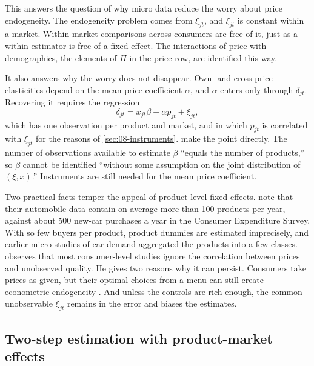 This answers the question of why micro data reduce the worry about price endogeneity. The endogeneity problem comes
from $\xi_{jt}$, and $\xi_{jt}$ is constant within a market. Within-market comparisons across consumers are free of it,
just as a within estimator is free of a fixed effect. The interactions of price with demographics, the elements of
$\Pi$ in the price row, are identified this way.

It also answers why the worry does not disappear. Own- and cross-price elasticities depend on the mean price
coefficient $\alpha$, and $\alpha$ enters only through $\delta_{jt}$. Recovering it requires the regression
\begin{equation}\label{eq:08-micro-second}
  \delta_{jt} = x_{jt}\beta - \alpha p_{jt} + \xi_{jt},
\end{equation}
which has one observation per product and market, and in which $p_{jt}$ is correlated with $\xi_{jt}$ for the reasons
of \cref{sec:08-instruments}. \citet[p.~73]{BerryLevinsohnPakes2004} make the point directly. The number of
observations available to estimate $\beta$ ``equals the number of products,'' so $\beta$ cannot be identified ``without
some assumption on the joint distribution of $(\xi, x)$.'' Instruments are still needed for the mean price
coefficient.

Two practical facts temper the appeal of product-level fixed effects. \citet[p.~852]{BerryLevinsohnPakes1995}
note that their automobile data contain on average more than 100 products per year, against about 500 new-car
purchases a year in the Consumer Expenditure Survey. With so few buyers per product, product dummies are estimated
imprecisely, and earlier micro studies of car demand aggregated the products into a few classes. \citet[Section~5.2]{Nevo2000a}
observes that most consumer-level studies ignore the correlation between prices and unobserved quality. He gives two
reasons why it can persist. Consumers take prices as given, but their optimal choices from a menu can still create
econometric endogeneity \citep{Kennan1989}. And unless the controls are rich enough, the common unobservable
$\xi_{jt}$ remains in the error and biases the estimates.

\subsection{Two-step estimation with product-market effects}\label{sec:08-micro-twostep}

